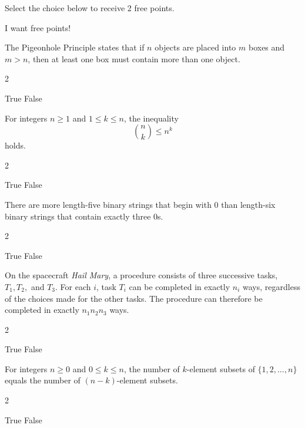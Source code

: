 \documentclass[11pt,addpoints]{exam}
\newcommand{\practiceShortSpace}{\par\vspace{0.55in}}
\newcommand{\practiceWorkSpace}{\par\vspace{0.85in}}
\begin{document}
\begin{questions}

\question[2] Select the choice below to receive 2 free points.
\begin{choices}
    \choice I want free points!
\end{choices}
\practiceWorkSpace

\question[3] The Pigeonhole Principle states that if $n$ objects are placed into $m$ boxes and $m>n$, then at least one box must contain more than one object.
\begin{multicols}{2}
\begin{choices}
    \choice True
    \choice False
\end{choices}
\end{multicols}
\practiceShortSpace

\question[3] For integers $n\ge 1$ and $1\le k\le n$, the inequality
\[
\binom{n}{k}\le n^k
\]
holds.
\begin{multicols}{2}
\begin{choices}
    \choice True
    \choice False
\end{choices}
\end{multicols}
\practiceShortSpace

\question[3] There are more length-five binary strings that begin with $0$ than length-six binary strings that contain exactly three $0$s.
\begin{multicols}{2}
\begin{choices}
    \choice True
    \choice False
\end{choices}
\end{multicols}
\practiceShortSpace

\question[3] On the spacecraft \textit{Hail Mary}, a procedure consists of three successive tasks, $T_1,T_2,$ and $T_3$. For each $i$, task $T_i$ can be completed in exactly $n_i$ ways, regardless of the choices made for the other tasks. The procedure can therefore be completed in exactly $n_1n_2n_3$ ways.
\begin{multicols}{2}
\begin{choices}
    \choice True
    \choice False
\end{choices}
\end{multicols}
\practiceShortSpace

\question[3] For integers $n\ge 0$ and $0\le k\le n$, the number of $k$-element subsets of $\{1,2,\ldots,n\}$ equals the number of $(n-k)$-element subsets.
\begin{multicols}{2}
\begin{choices}
    \choice True
    \choice False
\end{choices}
\end{multicols}
\practiceShortSpace


\end{questions}
\end{document}
